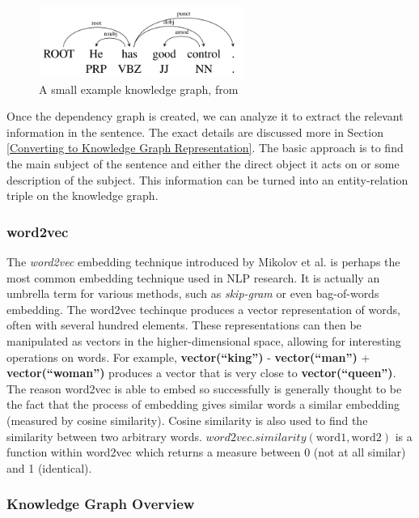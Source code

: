 \documentclass[pageno]{final_paper}
\begin{document}
\begin{figure}[!tb]
    \centering
    \includegraphics[width=0.6\textwidth,keepaspectratio]{figures/Dependency_Graph.png}
    \caption{A small example knowledge graph, from \cite{Chen2014}}
    \label{fig: dependency parsing}
\end{figure}

Once the dependency graph is created, we can analyze it to extract the relevant
information in the sentence. The exact details are discussed more in Section
\ref{Converting to Knowledge Graph Representation}. The basic approach is to
find the main subject of the sentence and either the direct object it acts on or
some description of the subject. This information can be turned into an
entity-relation triple on the knowledge graph.

\subsubsection{word2vec}
\label{word2vec}

The \textit{word2vec} embedding technique introduced by Mikolov et al.
\cite{Mikolov2013} is perhaps the most common embedding technique used in NLP
research. It is actually an umbrella term for various methods, such as
\textit{skip-gram} or even bag-of-words embedding. The word2vec techinque
produces a vector representation of words, often with several hundred elements.
These representations can then be manipulated as vectors in the
higher-dimensional space, allowing for interesting operations on words. For
example, \textbf{vector(``king'')} - \textbf{vector(``man'')} +
\textbf{vector(``woman'')} produces a vector that is very close to
\textbf{vector(``queen'')}. The reason word2vec is able to embed so successfully
is generally thought to be the fact that the process of embedding gives similar
words a similar embedding (measured by cosine similarity). Cosine similarity is
also used to find the similarity between two arbitrary words.
$word2vec.similarity(\text{word1}, \text{word2})$ is a function within word2vec
which returns a measure between 0 (not at all similar) and 1 (identical).

\subsubsection{Knowledge Graph Overview}
\label{Knowledge Graph Overview}
\end{document}
